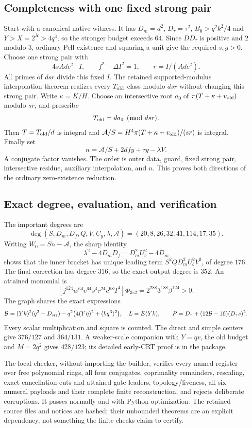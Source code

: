 \subsection{Completeness with one fixed strong pair}
Start with a canonical native witness. It has $D_m=d^2$, $D_\tau=\tau^2$,
$B_0>q^2k^2/4$ and $Y>X=2^R>4q^3$, so the stronger budget exceeds $64$.
Since $D D_\tau$ is positive and $2$ modulo $3$, ordinary Pell existence and
squaring a unit give the required $s,g>0$.
Choose one strong pair with
\[
 4sAdc^2\mid I,\qquad f^2-\Delta I^2=1,
 \qquad r=I/(Adc^2).
\]
All primes of $dsr$ divide this fixed $I$.
The retained supported-modulus interpolation theorem realizes every
$T_{\rm old}$ class modulo $dsr$ without changing this strong pair.
Write $\kappa=K/H$. Choose an intersective root $a_0$ of
$\pi(T+\kappa+v_{\rm old})$ modulo $sr$, and prescribe
\[
 T_{\rm old}=da_0\pmod{dsr}.
\]
Then $T=T_{\rm old}/d$ is integral and
$\mathcal A/S=H^4\pi(T+\kappa+v_{\rm old})/(sr)$ is integral.
Finally set
\[
 n=\mathcal A/S+2dfy+\tau g-\lambda V.
\]
A conjugate factor vanishes. The order is outer data, guard, fixed strong
pair, intersective residue, auxiliary interpolation, and $n$.
This proves both directions of the ordinary zero-existence reduction.

\subsection{Exact degree, evaluation, and verification}
The important degrees are
\[
 \deg(S,D_m,D_f,Q,V,C_y,\lambda,\mathcal A)
       =(20,8,26,32,41,114,17,35).
\]
Writing $W_0=Sn-\mathcal A$, the sharp identity
\[
 \lambda^2-4D_mD_f=D_m^2U_b^2-4D_m
\]
shows that the inner bracket has unique leading term
$S^2QD_m^2U_b^2V^2$, of degree $176$. The final correction has degree $316$,
so the exact output degree is $352$. An attained monomial is
\[
 [j^{124}w^{64}v^{64}s^4r^{24}c^{68}T^4]\Phi_{352}
      =2^{288}3^{188}\beta^{124}>0.
\]
The graph shares the exact expressions
\[
 \mathcal B=(Yk)^2(q^2-D_{\rm err})
          -q^2\bigl(4(Y\eta)^2+(kq^3)^2\bigr),\quad L=E(Yk),
 \qquad P=D_\tau+(12\mathcal B-16)(D_\tau s)^2.
\]
Every scalar multiplication and square is counted.
The direct and simple centers give $376/127$ and $364/131$.
A weaker-scale companion with $Y=qv$, the old budget and $M=2q^2$
gives $428/123$; its detailed early-CRT proof is in the package.

The local checker, without importing the builder, verifies every named
register over free polynomial rings, all four conjugates, coprimality
remainders, rescaling, exact cancellation cuts and attained gate leaders,
topology/liveness, all six numeral payloads and their complete finite
reconstruction, and rejects deliberate corruptions. It passes normally
and with Python optimization. The retained source files and notices are
hashed; their unbounded theorems are an explicit dependency, not something
the finite checks claim to certify.
